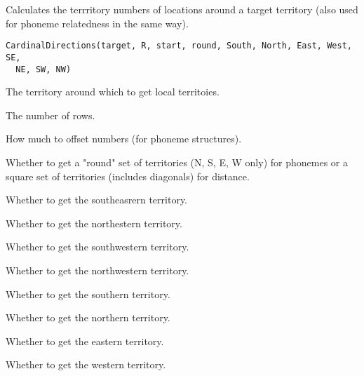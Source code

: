 \documentclass[a4paper]{book}
\begin{document}
%
\begin{Description}\relax
Calculates the terrritory numbers of locations around a target territory (also used for phoneme relatedness in the same way).
\end{Description}
%
\begin{Usage}
\begin{verbatim}
CardinalDirections(target, R, start, round, South, North, East, West, SE,
  NE, SW, NW)
\end{verbatim}
\end{Usage}
%
\begin{Arguments}
\begin{ldescription}
\item[\code{target}] The territory around which to get local territoies.

\item[\code{R}] The number of rows.

\item[\code{start}] How much to offset numbers (for phoneme structures).

\item[\code{round}] Whether to get a "round" set of territories (N, S, E, W only) for phonemes or a square set of territories (includes diagonals) for distance.

\item[\code{SE}] Whether to get the southeasrern territory.

\item[\code{NE}] Whether to get the northestern territory.

\item[\code{SW}] Whether to get the southwestern territory.

\item[\code{NW}] Whether to get the northwestern territory.

\item[\code{south}] Whether to get the southern territory.

\item[\code{north}] Whether to get the northern territory.

\item[\code{east}] Whether to get the eastern territory.

\item[\code{west}] Whether to get the western territory.
\end{ldescription}
\end{Arguments}
\end{document}
